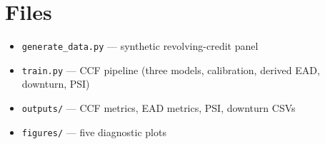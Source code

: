 \documentclass[a4paper,11pt]{article}
\begin{document}
\section{Files}

\begin{itemize}
  \item \texttt{generate\_data.py} --- synthetic revolving-credit panel
  \item \texttt{train.py} --- CCF pipeline (three models, calibration,
        derived EAD, downturn, PSI)
  \item \texttt{outputs/} --- CCF metrics, EAD metrics, PSI, downturn CSVs
  \item \texttt{figures/} --- five diagnostic plots
\end{itemize}
\end{document}

